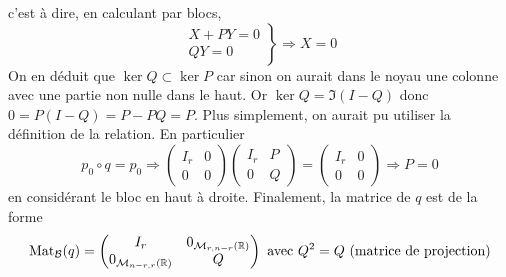 \begin{enumerate}
c'est à dire, en calculant par blocs,
\begin{displaymath}
  \left. 
\begin{aligned}
  X + PY = 0 \\ QY= 0
\end{aligned}
\right\rbrace  \Rightarrow X = 0
\end{displaymath}
On en déduit que $\ker Q \subset \ker P$ car sinon on aurait dans le noyau une colonne avec une partie non nulle dans le haut. Or $\ker Q = \Im (I -Q)$ donc $0 = P(I-Q) = P-PQ = P$.\newline
Plus simplement, on aurait pu utiliser la définition de la relation. En particulier
\begin{displaymath}
  p_0 \circ q  = p_0 \Rightarrow
\begin{pmatrix}
  I_r & 0 \\ 0 & 0
\end{pmatrix}
\begin{pmatrix}
  I_r & P \\ 0 & Q
\end{pmatrix}
=
\begin{pmatrix}
  I_r & 0 \\ 0 & 0
\end{pmatrix}
\Rightarrow P = 0
\end{displaymath}
en considérant le bloc en haut à droite.\newline
Finalement, la matrice de $q$ est de la forme
\begin{displaymath}
\operatorname{Mat}_{\mathcal{B}}(q)=
\begin{pmatrix}
  I_r & 0_{\mathcal{M}_{r,n-r}(\mathbb{R})} \\ 0_{\mathcal{M}_{n-r,r}(\mathbb{R})} & Q
\end{pmatrix}  \text{ avec } Q^2 = Q \text{ (matrice de projection)}
\end{displaymath}
\end{enumerate}

